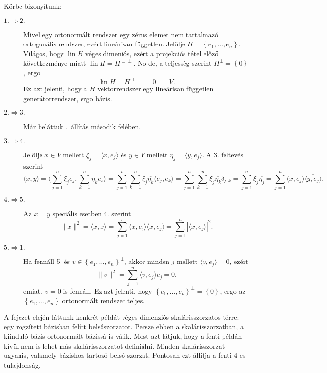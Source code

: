 \documentclass[9pt, a4paper, showtrims]{memoir}
\makeatletter
\renewenvironment{proof}[1][\proofname]
    {\par\pushQED{\qed}%
    \normalfont \topsep6\p@\@plus6\p@\relax
    \trivlist
    \item[\hskip\labelsep
        \itshape
    #1\@addpunct{:}]\ignorespaces}
    {\popQED\endtrivlist\@endpefalse}
\theoremstyle{plain}
\theoremstyle{remark}
\theoremstyle{definition}
\DeclareMathOperator{\lin}{lin}
\newcommand{\ip}[2]{\langle#1,#2\rangle}
\makeatother
\begin{document}
\begin{proof}
	Körbe bizonyítunk:
	\begin{description}
		\item[$1.\Rightarrow 2.$]
		      Mivel egy ortonormált rendszer egy zérus elemet nem tartalmazó ortogonális rendszer,
		      ezért lineárisan független.
		      Jelölje $H=\left\{ e_1,\ldots,e_n \right\}$.
		      Világos, hogy $\lin H$ véges dimeniós, ezért a projekciós tétel előző következménye miatt
		      $\lin H=H^{\perp\perp}$.
		      No de, a teljesség szerint $H^\perp=\left\{ 0 \right\}$,
		      ergo
		      \[
			      \lin H
			      =
			      H^{\perp\perp}
			      =
			      {0}^\perp
			      =
			      V.
		      \]
		      Ez azt jelenti, hogy a $H$ vektorrendszer egy lineárisan független generátorrendszer, ergo bázis.

		\item[$2.\Rightarrow 3.$]
		      Már beláttuk .~állítás második felében.

		\item[$3.\Rightarrow 4.$]
		      Jelölje $x\in V$ mellett $\xi_j=\ip{x}{e_j}$ és $y\in V$ mellett
		      $\eta_j=\ip{y}{e_j}$.
		      A 3. feltevés szerint
		      \[
			      \ip{x}{y}
			      =
			      \ip{\sum_{j=1}^n\xi_je_j}{\sum_{k=1}^n\eta_ke_k}
			      =
			      \sum_{j=1}^n\sum_{k=1}^n\xi_j\overline{\eta_k}\ip{e_j}{e_k}
			      =
			      \sum_{j=1}^n\sum_{k=1}^n\xi_j\overline{\eta_k}\delta_{j,k}
			      =
			      \sum_{j=1}^n\xi_j\overline{\eta_j}
			      =
			      \sum_{j=1}^n\ip{x}{e_j}\overline{\ip{y}{e_j}}.
		      \]

		\item[$4.\Rightarrow 5.$]
		      Az $x=y$ speciális esetben 4. szerint
		      \[
			      \|x\|^2
			      =
			      \ip{x}{x}
			      =
			      \sum_{j=1}^n\ip{x}{e_j}\overline{\ip{x}{e_j}}
			      =
			      \sum_{j=1}^n|\ip{x}{e_j}|^2.
		      \]

		\item[$5.\Rightarrow 1.$]
		      Ha fennáll 5. és $v\in\left\{ e_1,\ldots,e_n \right\}^\perp$,
		      akkor minden $j$ mellett $\ip{v}{e_j}=0$, ezért
		      \[
			      \|v\|^2
			      =
			      \sum_{j=1}^n\ip{v}{e_j}e_j
			      =
			      0.
		      \]
		      emiatt $v=0$ is fennáll.
		      Ez azt jelenti, hogy $\left\{ e_1,\ldots,e_n \right\}^\perp=\left\{ 0 \right\}$,
		      ergo az $\left\{ e_1,\ldots,e_n \right\}$ ortonormált rendszer teljes.\qedhere
	\end{description}
\end{proof}
A fejezet elején láttunk konkrét példát véges dimenziós skalárisszorzatos-térre:
egy rögzített bázisban felírt belsőszorzatot. Persze ebben a skalárisszorzatban,
a kiinduló bázis ortonormált bázissá is válik.
Most azt látjuk, hogy a fenti példán kívül nem is lehet más skalárisszorzatot definiálni.
Minden skalárisszorzat ugyanis, valamely bázishoz tartozó belső szorzat.
Pontosan ezt állítja a fenti 4-es tulajdonság.
\end{document}
